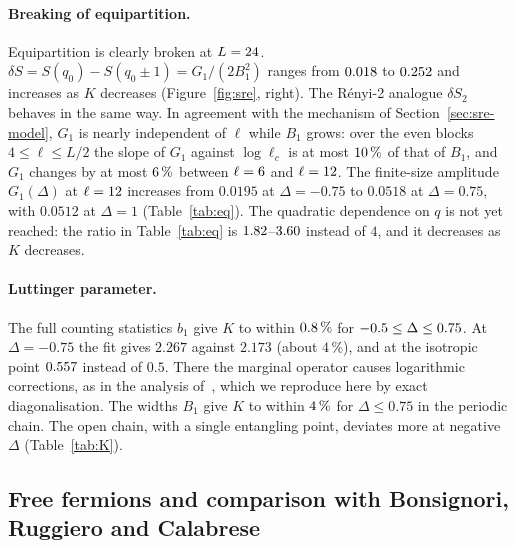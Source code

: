 \documentclass[11pt]{article}
\begin{document}
\paragraph{Breaking of equipartition.} Equipartition is clearly broken at $L=24$.
$\delta S=S(q_0)-S(q_0\pm1)=G_1/(2B_1^2)$ ranges from $0.018$ to $0.252$ and increases as $K$ decreases
(Figure~\ref{fig:sre}, right). The Rényi-2 analogue $\delta S_2$ behaves in the same way. In agreement with the
mechanism of Section~\ref{sec:sre-model}, $G_1$ is nearly independent of $\ell$ while $B_1$ grows: over the even blocks
$4\le\ell\le L/2$ the slope of $G_1$ against $\log\ell_c$ is at most $10\,\%$ of that of $B_1$, and
$G_1$ changes by at most $6\,\%$ between $\ell=6$ and $\ell=12$. The finite-size amplitude
$G_1(\Delta)$ at $\ell=12$ increases from $0.0195$ at $\Delta=-0.75$ to $0.0518$ at $\Delta=0.75$, with $0.0512$ at
$\Delta=1$ (Table~\ref{tab:eq}). The quadratic dependence on $q$ is not yet reached: the ratio in Table~\ref{tab:eq} is
$1.82$--$3.60$ instead of $4$, and it decreases as $K$ decreases.

\paragraph{Luttinger parameter.} The full counting statistics $b_1$ give $K$ to within $0.8\,\%$ for
$-0.5\le\Delta\le0.75$. At $\Delta=-0.75$ the fit gives $2.267$ against $2.173$ (about $4\,\%$),
and at the isotropic point $0.557$ instead of $0.5$. There the marginal operator causes logarithmic corrections, as
in the analysis of~\cite{song2012}, which we reproduce here by exact diagonalisation. The widths $B_1$ give $K$ to within
$4\,\%$ for $\Delta\le0.75$ in the periodic chain. The open chain, with a single entangling point,
deviates more at negative $\Delta$ (Table~\ref{tab:K}).

\subsection{Free fermions and comparison with Bonsignori, Ruggiero and Calabrese}\label{sec:sre-ff}
\end{document}
